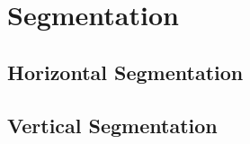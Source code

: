 \documentclass{standalone}
\begin{document}
\section{Segmentation}
\subsection{Horizontal Segmentation}
\subsection{Vertical Segmentation}
\end{document}
